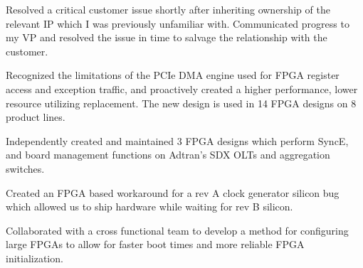 \documentclass[10pt]{deedy-resume-reversed}
\begin{document}
\begin{minipage}[t]{1.0\textwidth}
\begin{tightemize}
\item Resolved a critical customer issue shortly after inheriting ownership of the relevant IP which I was previously unfamiliar with. 
Communicated progress to my VP and resolved the issue in time to salvage the relationship with the customer.
\item Recognized the limitations of the PCIe DMA engine used for FPGA register access and exception traffic, 
and proactively created a higher performance, lower resource utilizing replacement. The new design is used in 14 FPGA designs on 8 product lines.
\item Independently created and maintained 3 FPGA designs which perform SyncE, and board management functions on Adtran's SDX OLTs and aggregation switches. 
\item Created an FPGA based workaround for a rev A clock generator silicon bug which allowed us to ship hardware while waiting for rev B silicon.
\item Collaborated with a cross functional team to develop a method for configuring large FPGAs to allow for faster boot times and more reliable FPGA initialization.
\end{tightemize}
\sectionsep


\end{minipage}
\end{document}
